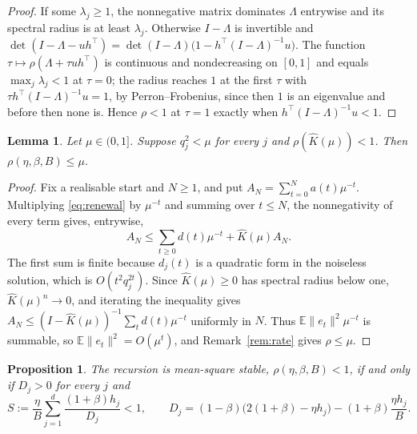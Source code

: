 \documentclass[11pt]{amsart}
\newtheorem{lemma}[theorem]{Lemma}
\newtheorem{proposition}[theorem]{Proposition}
\theoremstyle{definition}
\theoremstyle{remark}
\numberwithin{equation}{section}
\newcommand{\E}{\mathbb{E}}
\begin{document}
\begin{proof}
If some $\lambda_j\ge1$, the nonnegative matrix dominates $\Lambda$ entrywise and its spectral radius is at least $\lambda_j$. Otherwise $I-\Lambda$ is invertible and $\det(I-\Lambda-uh^\top)=\det(I-\Lambda)\bigl(1-h^\top(I-\Lambda)^{-1}u\bigr)$. The function $\tau\mapsto\rho(\Lambda+\tau uh^\top)$ is continuous and nondecreasing on $[0,1]$ and equals $\max_j\lambda_j<1$ at $\tau=0$; the radius reaches $1$ at the first $\tau$ with $\tau h^\top(I-\Lambda)^{-1}u=1$, by Perron--Frobenius, since then $1$ is an eigenvalue and before then none is. Hence $\rho<1$ at $\tau=1$ exactly when $h^\top(I-\Lambda)^{-1}u<1$.
\end{proof}

\begin{lemma}\label{lem:weighted}
Let $\mu\in(0,1]$. Suppose $q_j^2<\mu$ for every $j$ and $\rho(\widehat K(\mu))<1$. Then $\rho(\eta,\beta,B)\le\mu$.
\end{lemma}

\begin{proof}
Fix a realisable start and $N\ge1$, and put $A_N=\sum_{t=0}^Na(t)\mu^{-t}$. Multiplying \eqref{eq:renewal} by $\mu^{-t}$ and summing over $t\le N$, the nonnegativity of every term gives, entrywise,
\[
A_N\le\sum_{t\ge0}d(t)\mu^{-t}+\widehat K(\mu)A_N .
\]
The first sum is finite because $d_j(t)$ is a quadratic form in the noiseless solution, which is $O(t^2q_j^{2t})$. Since $\widehat K(\mu)\ge0$ has spectral radius below one, $\widehat K(\mu)^n\to0$, and iterating the inequality gives $A_N\le(I-\widehat K(\mu))^{-1}\sum_td(t)\mu^{-t}$ uniformly in $N$. Thus $\E\|e_t\|^2\mu^{-t}$ is summable, so $\E\|e_t\|^2=O(\mu^t)$, and Remark~\ref{rem:rate} gives $\rho\le\mu$.
\end{proof}

\begin{proposition}\label{prop:stability}
The recursion is mean-square stable, $\rho(\eta,\beta,B)<1$, if and only if $D_j>0$ for every $j$ and
\[
S:=\frac\eta B\sum_{j=1}^d\frac{(1+\beta)h_j}{D_j}<1,\qquad D_j=(1-\beta)\bigl(2(1+\beta)-\eta h_j\bigr)-(1+\beta)\frac{\eta h_j}{B}.
\]
\end{proposition}
\end{document}
